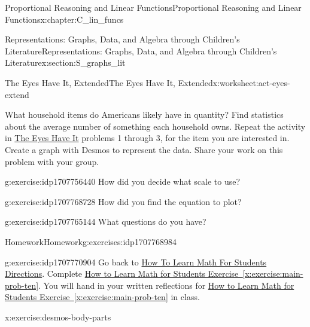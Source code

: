 \documentclass[oneside,10pt,]{book}
\newcommand{\xreffont}{\relax}
\numberwithin{equation}{chapter}
\begin{document}
\begin{chapterptx}{Proportional Reasoning and Linear Functions}{}{Proportional Reasoning and Linear Functions}{}{}{x:chapter:C_lin_funcs}
\begin{sectionptx}{Representations: Graphs, Data, and Algebra through Children's Literature}{}{Representations: Graphs, Data, and Algebra through Children's Literature}{}{}{x:section:S_graphs_lit}
\typeout{************************************************}
%
\begin{worksheet-subsection}{The Eyes Have It, Extended}{}{The Eyes Have It, Extended}{}{}{x:worksheet:act-eyes-extend}
\begin{introduction}{}%
What household items do Americans likely have in quantity? Find statistics about the average number of something each household owns. Repeat the activity in \hyperref[x:worksheet:act-eyes]{The Eyes Have It} problems 1 through 3, for the item you are interested in. Create a graph with Desmos to represent the data. Share your work on this problem with your group.%
\end{introduction}%
\begin{divisionexercise}{1}{}{}{g:exercise:idp1707756440}%
How did you decide what scale to use?%
\end{divisionexercise}%
\begin{divisionexercise}{2}{}{}{g:exercise:idp1707768728}%
How did you find the equation to plot?%
\end{divisionexercise}%
\begin{divisionexercise}{3}{}{}{g:exercise:idp1707765144}%
What questions do you have?%
\end{divisionexercise}%
\end{worksheet-subsection}
\restoregeometry
%
%
\typeout{************************************************}
\typeout{************************************************}
%
\begin{exercises-subsection}{Homework}{}{Homework}{}{}{g:exercises:idp1707768984}
\begin{divisionexercise}{1}{}{}{g:exercise:idp1707770904}%
Go back to \hyperlink{x:paragraphs:htlmfs-directions}{How To Learn Math For Students Directions}. Complete \hyperref[x:exercise:main-prob-ten]{How to Learn Math for Students Exercise~{\xreffont\ref{x:exercise:main-prob-ten}}}. You will hand in your written reflections for \hyperref[x:exercise:main-prob-ten]{How to Learn Math for Students Exercise~{\xreffont\ref{x:exercise:main-prob-ten}}} in class.%
\end{divisionexercise}%
\begin{divisionexercise}{2}{}{}{x:exercise:desmos-body-parts}%

\end{divisionexercise}
\end{exercises-subsection}
\end{sectionptx}
\end{chapterptx}
\end{document}
